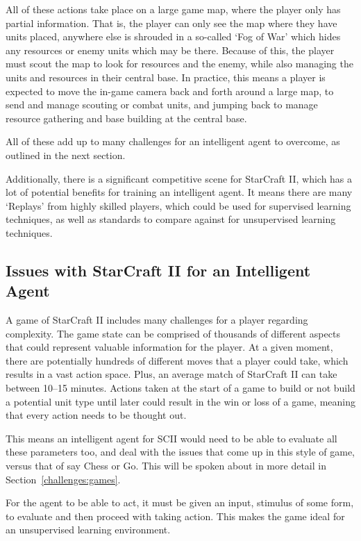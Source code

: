 All of these actions take place on a large game map, where the player only has
partial information. That is, the player can only see the map where they have
units placed, anywhere else is shrouded in a so-called `Fog of War' which hides
any resources or enemy units which may be there.
Because of this, the player must scout the map to look for resources and the
enemy, while also managing the units and resources in their central base.
In practice, this means a player is expected to move the in-game camera back
and forth around a large map, to send and manage scouting or combat units,
and jumping back to manage resource gathering and base building at the central
base.

All of these add up to many challenges for an intelligent agent to
overcome, as outlined in the next section.

Additionally, there is a significant competitive scene for StarCraft
II\cite{scIIprof}, which has a lot of potential benefits for training an
intelligent agent. It means there are many `Replays' from highly
skilled players, which could be used for supervised learning techniques, as well
as standards to compare against for unsupervised learning techniques.

\subsection{Issues with StarCraft II for an Intelligent Agent}
A game of StarCraft II includes many challenges for a player regarding
complexity. The game state can be comprised of thousands of different aspects
that could represent valuable information for the player. At a given moment,
there are potentially hundreds of different moves that a player could take,
which results in a vast action space. Plus, an average match of StarCraft II
can take between 10--15 minutes. Actions taken at the start of a game to build
or not build a potential unit type until later could result in the win or loss
of a game, meaning that every action needs to be thought out.

This means an intelligent agent for SCII would need to be able to evaluate all
these parameters too, and deal with the issues that come up in this style of
game, versus that of say Chess or Go. This will be spoken about in more detail
in Section~\ref{challenges:games}.


For the agent to be able to act, it must be given an input, stimulus of some
form, to evaluate and then proceed with taking action. This makes the game
ideal for an unsupervised learning environment.

